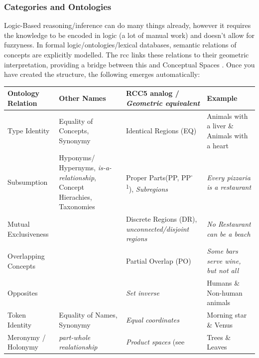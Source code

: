 \subsubsection*{Categories and Ontologies}



Logic-Based reasoning/inference can do many things already, however it requires the knowledge to be encoded in logic (a lot of manual work) and doesn't allow for fuzzyness.
In formal logic/ontologies/lexical databases, semantic relations of concepts are explicitly modelled. The \gls{rcc} \cite{Cohn1997a} links these relations to their geometric interpretation, providing a bridge between this and Conceptual Spaces \cite{Gardenfors2001}. Once you have created the structure, the following emerges automatically:

\vspace{2ex}

\begin{tabularx}{1.05\textwidth}{P{0.16\textwidth}|P{0.25\textwidth}|P{0.25\textwidth}|X}
    Ontology Relation & Other Names        & RCC5 \cite{Cohn1997a} analog / \textit{Geometric equivalent} & Example \\ \midrule

    Type Identity     & {\scriptsize Equality of Concepts, Synonymy } & Identical Regions (EQ)      & Animals with a liver \& Animals with a heart \\ 

    Subsumption       & {\scriptsize Hyponyms/ Hypernyms, \textit{is-a-relationship}, Concept Hierachies, Taxonomies }
                                           & Proper Parts(PP, PP\textsuperscript{-1}), \textit{Subregions}
                                                                          & \textit{Every pizzaria is a restaurant} \\  
    
    Mutual 
    Exclusiveness     &                    & Discrete Regions (DR), \textit{unconnected/disjoint regions}
                                                                          & \textit{No Restaurant can be a beach} \\  

    Overlapping 
    Concepts          &                    & Partial Overlap (PO)         & \textit{Some bars serve wine, but not all} \\  

    Opposites         &                    & \textit{Set inverse}         & Humans \& Non-human animals \\ 

    Token Identity    & {\scriptsize Equality of Names, Synonymy } & \textit{Equal coordinates}   & Morning star \& Venus \\ 
    Meronymy / Holonymy & {\scriptsize \textit{part-whole realationship} }& \textit{Product spaces} (see \cite{Fiorini2013}        & Trees \& Leaves
\end{tabularx}

